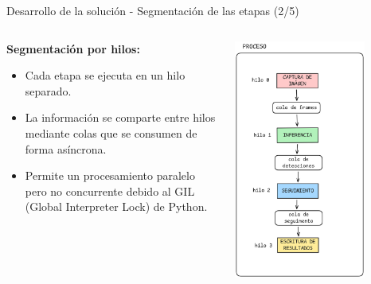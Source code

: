 \documentclass[spanish]{beamer}
\begin{document}
\begin{frame}{Desarrollo de la solución - Segmentación de las etapas (2/5)}
    \begin{columns}
        \begin{column}{0.5\textwidth}
            \textbf{Segmentación por hilos:}
            \begin{itemize}
                \item Cada etapa se ejecuta en un hilo separado.
                \item La información se comparte entre hilos mediante colas que se consumen de forma asíncrona.
                \item Permite un procesamiento paralelo pero no concurrente debido al GIL (Global Interpreter Lock) de Python.
            \end{itemize}
        \end{column}
        \begin{column}{0.5\textwidth}
            \begin{center}
                \includegraphics[width=0.75\textwidth]{images/solucion_propuesta/segmentacion_hilos.png}
            \end{center}
        \end{column}
    \end{columns}

\end{frame}
\end{document}
